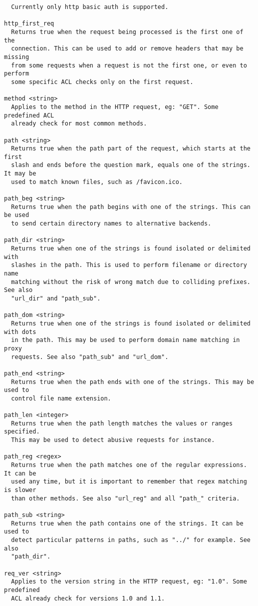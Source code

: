 \begin{verbatim}
  Currently only http basic auth is supported.

http_first_req
  Returns true when the request being processed is the first one of the
  connection. This can be used to add or remove headers that may be missing
  from some requests when a request is not the first one, or even to perform
  some specific ACL checks only on the first request.

method <string>
  Applies to the method in the HTTP request, eg: "GET". Some predefined ACL
  already check for most common methods.

path <string>
  Returns true when the path part of the request, which starts at the first
  slash and ends before the question mark, equals one of the strings. It may be
  used to match known files, such as /favicon.ico.

path_beg <string>
  Returns true when the path begins with one of the strings. This can be used
  to send certain directory names to alternative backends.

path_dir <string>
  Returns true when one of the strings is found isolated or delimited with
  slashes in the path. This is used to perform filename or directory name
  matching without the risk of wrong match due to colliding prefixes. See also
  "url_dir" and "path_sub".

path_dom <string>
  Returns true when one of the strings is found isolated or delimited with dots
  in the path. This may be used to perform domain name matching in proxy
  requests. See also "path_sub" and "url_dom".

path_end <string>
  Returns true when the path ends with one of the strings. This may be used to
  control file name extension.

path_len <integer>
  Returns true when the path length matches the values or ranges specified.
  This may be used to detect abusive requests for instance.

path_reg <regex>
  Returns true when the path matches one of the regular expressions. It can be
  used any time, but it is important to remember that regex matching is slower
  than other methods. See also "url_reg" and all "path_" criteria.

path_sub <string>
  Returns true when the path contains one of the strings. It can be used to
  detect particular patterns in paths, such as "../" for example. See also
  "path_dir".

req_ver <string>
  Applies to the version string in the HTTP request, eg: "1.0". Some predefined
  ACL already check for versions 1.0 and 1.1.


\end{verbatim}
